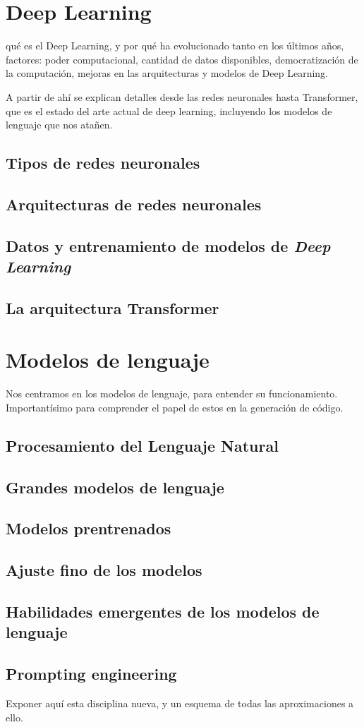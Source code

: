 \section{Deep Learning}

qué es el Deep Learning, y por qué ha evolucionado tanto en los últimos años, factores: poder computacional, cantidad de datos disponibles, democratización de la computación, mejoras en las arquitecturas y modelos de Deep Learning.

A partir de ahí se explican detalles desde las redes neuronales hasta Transformer, que es el estado del arte actual de deep learning, incluyendo los modelos de lenguaje que nos atañen.


\subsection{Tipos de redes neuronales}
\subsection{Arquitecturas de redes neuronales}
\subsection{Datos y entrenamiento de modelos de \textit{Deep Learning}}
\subsection{La arquitectura Transformer}

\section{Modelos de lenguaje}

Nos centramos en los modelos de lenguaje, para entender su funcionamiento. Importantísimo para comprender el papel de estos en la generación de código.

\subsection{Procesamiento del Lenguaje Natural}
\subsection{Grandes modelos de lenguaje}
\subsection{Modelos prentrenados}
\subsection{Ajuste fino de los modelos}
\subsection{Habilidades emergentes de los modelos de lenguaje}
\subsection{Prompting engineering}
Exponer aquí esta disciplina nueva, y un esquema de todas las aproximaciones a ello.

